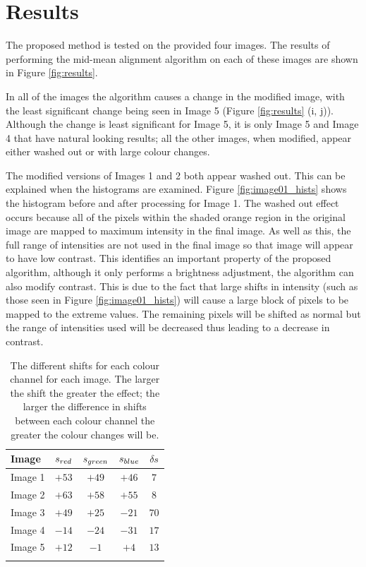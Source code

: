\documentclass[journal,transmag]{IEEEtran}
\begin{document}
\section{Results}
\label{sec:results}

The proposed method is tested on the provided four images.  The results of performing the mid-mean alignment algorithm on each of these images are shown in Figure \ref{fig:results}.

In all of the images the algorithm causes a change in the modified image, with the least significant change being seen in Image 5 (Figure \ref{fig:results} (i, j)).  Although the change is least significant for Image 5, it is only Image 5 and Image 4 that have natural looking results; all the other images, when modified, appear either washed out or with large colour changes.  

The modified versions of Images 1 and 2 both appear washed out.  This can be explained when the histograms are examined.  Figure \ref{fig:image01_hists} shows the histogram before and after processing for Image 1.  The washed out effect occurs because all of the pixels within the shaded orange region in the original image are mapped to maximum intensity in the final image.  As well as this, the full range of intensities are not used in the final image so that image will appear to have low contrast.  This identifies an important property of the proposed algorithm, although it only performs a brightness adjustment, the algorithm can also modify contrast.  This is due to the fact that large shifts in intensity (such as those seen in Figure \ref{fig:image01_hists}) will cause a large block of pixels to be mapped to the extreme values.  The remaining pixels will be shifted as normal but the range of intensities used will be decreased thus leading to a decrease in contrast.

\begin{table}[t]
\centering
\normalsize{
\begin{tabular}{ l c c c c}

	\toprule
  Image	&	$s_{\mbox{\tiny{red}}}$	& $s_{\mbox{\tiny{green}}}$	& $s_{\mbox{\tiny{blue}}}$  & $\delta s$\\
  \midrule
  Image 1	&      $+53$				& $+49$					& $+46$ 				& $7$\\
  Image 2	&      $+63$				& $+58$					& $+55$ 				& $8$ \\	
  Image 3	&      $+49$				& $+25$					& $-21$ 				& $70$\\
  Image 4	&      $-14$				& $-24$					& $-31$ 				& $17$ \\
  Image 5	&      $+12$				& $-1$					& $+4$ 				& $13$\\
  \bottomrule
  \vspace{5pt}
\end{tabular}
}
\caption{The different shifts for each colour channel for each image.  The larger the shift the greater the effect; the larger the difference in shifts between each colour channel the greater the colour changes will be.}
\label{tbl:shifts}
\end{table}
\end{document}
